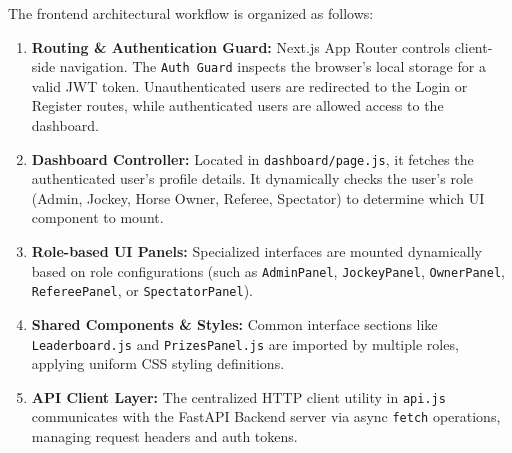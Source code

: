 The frontend architectural workflow is organized as follows:
\begin{enumerate}
    \item \textbf{Routing \& Authentication Guard:} Next.js App Router controls client-side navigation. The \texttt{Auth Guard} inspects the browser's local storage for a valid JWT token. Unauthenticated users are redirected to the Login or Register routes, while authenticated users are allowed access to the dashboard.
    \item \textbf{Dashboard Controller:} Located in \texttt{dashboard/page.js}, it fetches the authenticated user's profile details. It dynamically checks the user's role (Admin, Jockey, Horse Owner, Referee, Spectator) to determine which UI component to mount.
    \item \textbf{Role-based UI Panels:} Specialized interfaces are mounted dynamically based on role configurations (such as \texttt{AdminPanel}, \texttt{JockeyPanel}, \texttt{OwnerPanel}, \texttt{RefereePanel}, or \texttt{SpectatorPanel}).
    \item \textbf{Shared Components \& Styles:} Common interface sections like \texttt{Leaderboard.js} and \texttt{PrizesPanel.js} are imported by multiple roles, applying uniform CSS styling definitions.
    \item \textbf{API Client Layer:} The centralized HTTP client utility in \texttt{api.js} communicates with the FastAPI Backend server via async \texttt{fetch} operations, managing request headers and auth tokens.
\end{enumerate}
